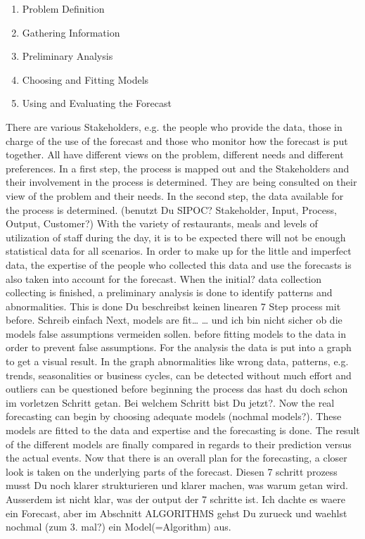 \begin{enumerate}
\item Problem Definition
\item Gathering Information
\item Preliminary Analysis
\item Choosing and Fitting Models
\item Using and Evaluating the Forecast
\end{enumerate}

There are various Stakeholders, e.g. the people who provide the data, those in charge of the use of the forecast and those who monitor how the forecast is put together. All have different views on the problem, different needs and different preferences. In a first step, the process is mapped out and the Stakeholders and their involvement in the process is determined. They are being consulted on their view of the problem and their needs.\newline
In the second step, the data available for the process is determined. (benutzt Du SIPOC? Stakeholder, Input, Process, Output, Customer?) With the variety of restaurants, meals and levels of utilization of staff during the day, it is to be expected there will not be enough statistical data for all scenarios. In order to make up for the little and imperfect data, the expertise of the people who collected this data and use the forecasts is also taken into account for the forecast. When the initial? data collection collecting is finished, a preliminary analysis is done to identify patterns and abnormalities. This is done Du beschreibst keinen linearen 7 Step process mit before. Schreib einfach Next, models are fit… … und ich bin nicht sicher ob die models false assumptions vermeiden sollen. before fitting models to the data in order to prevent false assumptions. For the analysis the data is put into a graph to get a visual result. In the graph abnormalities like wrong data, patterns, e.g. trends, seasonalities or business cycles, can be detected without much effort and outliers can be questioned before beginning the process das hast du doch schon im vorletzen Schritt getan. Bei welchem Schritt bist Du jetzt?. Now the real forecasting can begin by choosing adequate models (nochmal models?). These models are fitted to the data and expertise and the forecasting is done. The result of the different models are finally compared in regards to their prediction versus the actual events.
Now that there is an overall plan for the forecasting, a closer look is taken on the underlying parts of the forecast.
Diesen 7 schritt prozess musst Du noch klarer strukturieren und klarer machen, was warum getan wird. Ausserdem ist nicht klar, was der output der 7 schritte ist. Ich dachte es waere ein Forecast, aber im Abschnitt ALGORITHMS gehst Du zurueck und waehlst nochmal (zum 3. mal?) ein Model(=Algorithm) aus.

